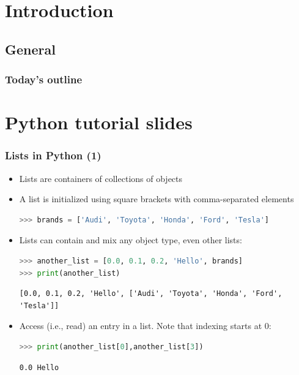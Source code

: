 \section{Introduction}
\subsection*{General}
\begin{frame}[label=contents_prog1]
  \frametitle{Today's outline}
\end{frame}

\section{Python tutorial slides}
\begin{frame}[fragile]
   \frametitle{Lists in Python (1)}
  \begin{itemize}
    \item Lists are containers of collections of objects
    \item A list is initialized using square brackets with comma-separated elements
    \begin{lstlisting}[language=Python,numbers=none]
>>> brands = ['Audi', 'Toyota', 'Honda', 'Ford', 'Tesla']
    \end{lstlisting}
    \item Lists can contain and mix any object type, even other lists:
    \begin{lstlisting}[language=Python,numbers=none]
>>> another_list = [0.0, 0.1, 0.2, 'Hello', brands]
>>> print(another_list)
    \end{lstlisting}
    \begin{lstlisting}[style=PyOutput]
[0.0, 0.1, 0.2, 'Hello', ['Audi', 'Toyota', 'Honda', 'Ford', 'Tesla']]
    \end{lstlisting}
    \item Access (i.e., read) an entry in a list. Note that indexing starts at 0:
    \begin{lstlisting}[language=Python,numbers=none]
>>> print(another_list[0],another_list[3])
    \end{lstlisting}
    \begin{lstlisting}[style=PyOutput]
0.0 Hello
    \end{lstlisting}
  \end{itemize}
 \end{frame}
 
